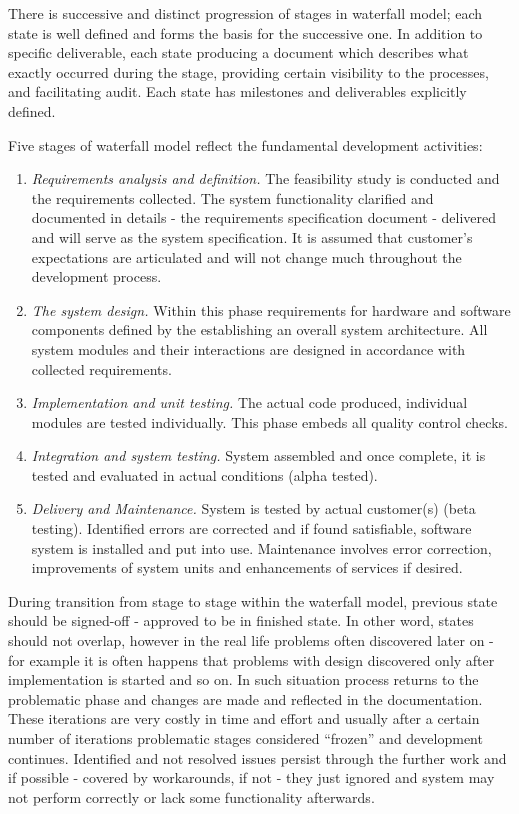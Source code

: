 There is successive and distinct progression of stages in waterfall model; each state 
is well defined and forms the basis for the successive one. In addition to specific 
deliverable, each state producing a document which describes what exactly occurred 
during the stage, providing certain visibility to the processes, and facilitating 
audit. Each state has milestones and deliverables explicitly defined.

Five stages of waterfall model reflect the fundamental development activities:
\begin{enumerate}
 \item \textit{Requirements analysis and definition.} The feasibility study 
is conducted 
and the requirements collected. The system functionality clarified and
documented in details - the requirements specification document - delivered  
and will serve as the system specification. It is assumed that customer's 
expectations are articulated and will not change much throughout the development 
process.
 \item \textit{The system design.} Within this phase requirements for hardware and 
software components defined by the establishing an overall system architecture.
All system modules and their interactions are designed in accordance with 
collected requirements.
 \item \textit{Implementation and unit testing.} The actual code produced, individual 
modules are tested individually. This phase embeds all quality control checks.
 \item \textit{Integration and system testing.} System assembled and once complete, it
is tested and evaluated in actual conditions (alpha tested).
 \item \textit{Delivery and Maintenance.} System is tested by actual customer(s) 
(beta testing). Identified errors are corrected and if found satisfiable, 
software system is installed and put into use. Maintenance involves error correction, 
improvements of system units and enhancements of services if desired.
\end{enumerate}

During transition from stage to stage within the waterfall model, previous state 
should be signed-off - approved to be in finished state. In other 
word, states should not overlap, however in the real life problems often discovered
later on - for example it is often happens that problems with design 
discovered only after implementation is started and so on. In such situation
process returns to the problematic phase and changes are made and reflected in 
the documentation. These iterations are very costly in time and effort and 
usually after a certain number of iterations problematic stages considered 
``frozen'' and development continues. Identified and not resolved issues persist
through the further work and if possible - covered by workarounds, if not - 
they just ignored and system may not perform correctly or lack some functionality 
afterwards.

